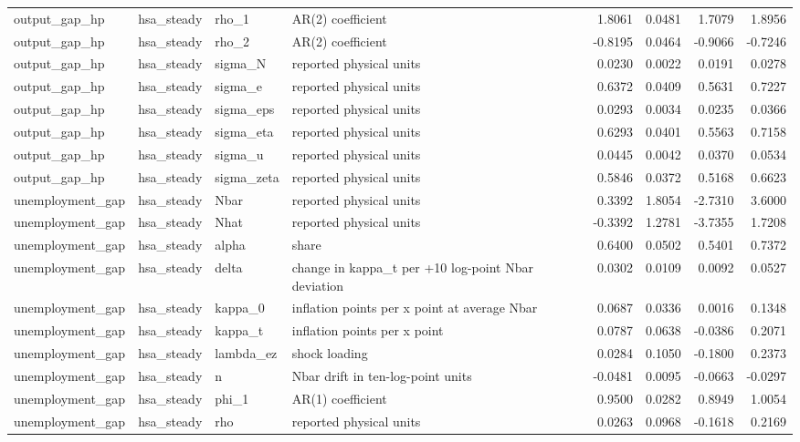 \begin{tabular}{llllrrrr}
output\_gap\_hp & hsa\_steady & rho\_1 & AR(2) coefficient & 1.8061 & 0.0481 & 1.7079 & 1.8956 \\
output\_gap\_hp & hsa\_steady & rho\_2 & AR(2) coefficient & -0.8195 & 0.0464 & -0.9066 & -0.7246 \\
output\_gap\_hp & hsa\_steady & sigma\_N & reported physical units & 0.0230 & 0.0022 & 0.0191 & 0.0278 \\
output\_gap\_hp & hsa\_steady & sigma\_e & reported physical units & 0.6372 & 0.0409 & 0.5631 & 0.7227 \\
output\_gap\_hp & hsa\_steady & sigma\_eps & reported physical units & 0.0293 & 0.0034 & 0.0235 & 0.0366 \\
output\_gap\_hp & hsa\_steady & sigma\_eta & reported physical units & 0.6293 & 0.0401 & 0.5563 & 0.7158 \\
output\_gap\_hp & hsa\_steady & sigma\_u & reported physical units & 0.0445 & 0.0042 & 0.0370 & 0.0534 \\
output\_gap\_hp & hsa\_steady & sigma\_zeta & reported physical units & 0.5846 & 0.0372 & 0.5168 & 0.6623 \\
unemployment\_gap & hsa\_steady & Nbar & reported physical units & 0.3392 & 1.8054 & -2.7310 & 3.6000 \\
unemployment\_gap & hsa\_steady & Nhat & reported physical units & -0.3392 & 1.2781 & -3.7355 & 1.7208 \\
unemployment\_gap & hsa\_steady & alpha & share & 0.6400 & 0.0502 & 0.5401 & 0.7372 \\
unemployment\_gap & hsa\_steady & delta & change in kappa\_t per +10 log-point Nbar deviation & 0.0302 & 0.0109 & 0.0092 & 0.0527 \\
unemployment\_gap & hsa\_steady & kappa\_0 & inflation points per x point at average Nbar & 0.0687 & 0.0336 & 0.0016 & 0.1348 \\
unemployment\_gap & hsa\_steady & kappa\_t & inflation points per x point & 0.0787 & 0.0638 & -0.0386 & 0.2071 \\
unemployment\_gap & hsa\_steady & lambda\_ez & shock loading & 0.0284 & 0.1050 & -0.1800 & 0.2373 \\
unemployment\_gap & hsa\_steady & n & Nbar drift in ten-log-point units & -0.0481 & 0.0095 & -0.0663 & -0.0297 \\
unemployment\_gap & hsa\_steady & phi\_1 & AR(1) coefficient & 0.9500 & 0.0282 & 0.8949 & 1.0054 \\
unemployment\_gap & hsa\_steady & rho & reported physical units & 0.0263 & 0.0968 & -0.1618 & 0.2169 \\

\end{tabular}
